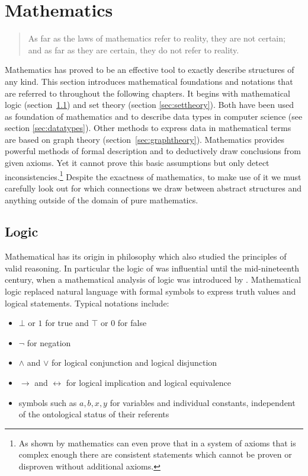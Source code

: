 \section{Mathematics}
\label{sec:mathematics}

\begin{quotation}%
As far as the laws of mathematics refer to reality, they are not certain;\\
and as far as they are certain, they do not refer to reality.\\
\quotationsource{}
\end{quotation}

\noindent Mathematics has proved to be an effective tool to exactly describe
structures of any kind.  This section introduces mathematical foundations and
notations that are referred to throughout the following chapters. It begins
with mathematical logic (section~\ref{sec:logic}) and set theory (section
\ref{sec:settheory}). Both have been used as foundation of mathematics and to
describe data types in computer science (see section \ref{sec:datatypes}).
Other methods to express data in mathematical terms are based on graph theory
(section~\ref{sec:graphtheory}).  Mathematics provides powerful methods of
formal description and to deductively draw conclusions from given axioms. Yet
it cannot prove this basic assumptions but only detect
inconsistencies.\footnote{As shown by \textcite{Goedel1931} mathematics can
even prove that in a system of axioms that is complex enough there are
consistent statements which cannot be proven or disproven without additional
axioms.} Despite the exactness of mathematics, to make use of it we must
carefully look out for which connections we draw between abstract structures
and anything outside of the domain of pure mathematics.

\subsection{Logic}
\label{sec:logic}

Mathematical  has its origin in philosophy which also studied the
principles of valid reasoning. In particular the logic of 
was influential until the mid-nineteenth century, when a mathematical analysis
of logic was introduced by \textcite{Boole1847,Boole1854}. Mathematical logic
replaced natural language with formal symbols to express truth values and logical
statements. Typical notations include:

\begin{itemize}
\item $\bot$ or $1$ for true and $\top$ or $0$ for false
\item $\lnot$ for negation
\item $\land$ and $\lor$ for logical conjunction and logical disjunction
\item $\to$ and $\leftrightarrow$ for logical implication and logical equivalence 
\item symbols such as $a, b, x, y$ for variables and individual
  constants, independent of the ontological status of their referents
\end{itemize}

